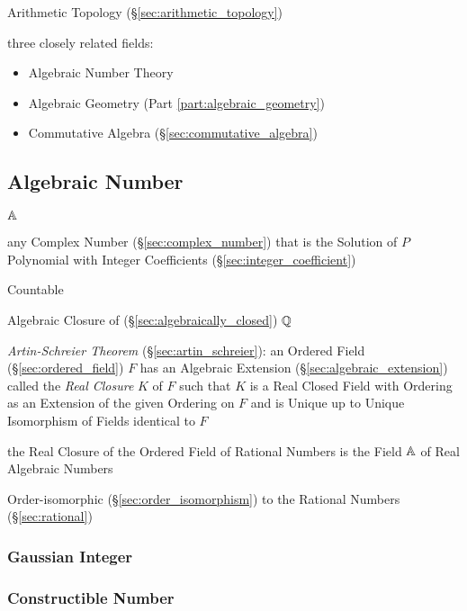Arithmetic Topology (\S\ref{sec:arithmetic_topology})

three closely related fields:
\begin{itemize}
  \item Algebraic Number Theory
  \item Algebraic Geometry (Part \ref{part:algebraic_geometry})
  \item Commutative Algebra (\S\ref{sec:commutative_algebra})
\end{itemize}



\subsection{Algebraic Number}\label{sec:algebraic_number}

$\mathbb{A}$

any Complex Number (\S\ref{sec:complex_number}) that is the Solution of $P$
Polynomial with Integer Coefficients (\S\ref{sec:integer_coefficient})

Countable

Algebraic Closure of (\S\ref{sec:algebraically_closed}) $\mathbb{Q}$

\emph{Artin-Schreier Theorem} (\S\ref{sec:artin_schreier}):
an Ordered Field (\S\ref{sec:ordered_field}) $F$ has an Algebraic Extension
(\S\ref{sec:algebraic_extension}) called the \emph{Real Closure} $K$ of $F$
such that $K$ is a Real Closed Field with Ordering as an Extension of the given
Ordering on $F$ and is Unique up to Unique Isomorphism of Fields identical to
$F$

the Real Closure of the Ordered Field of Rational Numbers is the Field
$\mathbb{A}$ of Real Algebraic Numbers

Order-isomorphic (\S\ref{sec:order_isomorphism}) to the Rational
Numbers (\S\ref{sec:rational})



\subsubsection{Gaussian Integer}\label{sec:gaussian_integer}\hfill

\subsubsection{Constructible Number}\label{sec:constructible_number}\hfill




